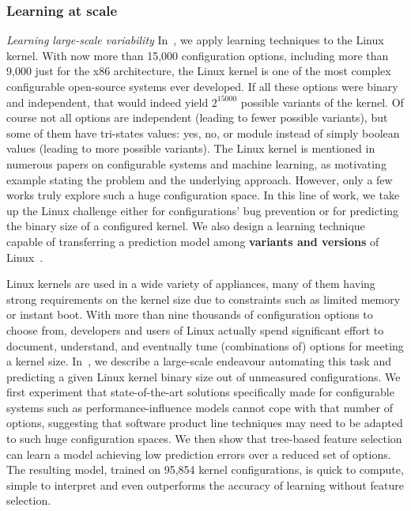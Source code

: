 \subsubsection{Learning at scale}

\emph{Learning large-scale variability}
In~\cite{acher:hal-03720273}, we apply learning techniques to the Linux kernel. 
With now more than 15,000 configuration options, including more than 9,000 just for the x86 architecture, the Linux kernel is one of the most complex configurable open-source systems ever developed. If all these options were binary and independent, that would indeed yield $2^{15000}$ possible variants of the kernel. Of course not all options are independent (leading to fewer possible variants), but some of them have tri-states values: yes, no, or module instead of simply boolean values (leading to more possible variants). 
The Linux kernel is mentioned in numerous papers on configurable systems and machine learning, as motivating example stating the problem and the underlying approach. 
However, only a few works truly explore such a huge configuration space. In this line of work, we take up the Linux challenge either for configurations' bug prevention or for predicting the binary size of a configured kernel. We also design a learning technique capable of transferring a prediction model among \textbf{variants and versions} of Linux~\cite{martin:hal-03358817}. 

Linux kernels are used in a wide variety of appliances, many of them having strong requirements on the kernel size due to constraints such as limited memory or instant boot. With more than nine thousands of configuration options to choose from, developers and users of Linux actually spend significant effort to document, understand, and eventually tune (combinations of) options for meeting a kernel size. In~\cite{acher:hal-03720273}, we describe a large-scale endeavour automating this task and predicting a given Linux kernel binary size out of unmeasured configurations. We first experiment that state-of-the-art solutions specifically made for configurable systems such as performance-influence models cannot cope with that number of options, suggesting that software product line techniques may need to be adapted to such huge configuration spaces. We then show that tree-based feature selection can learn a model achieving low prediction errors over a reduced set of options. The resulting model, trained on 95,854 kernel configurations, is quick to compute, simple to interpret and even outperforms the accuracy of learning without feature selection. 

